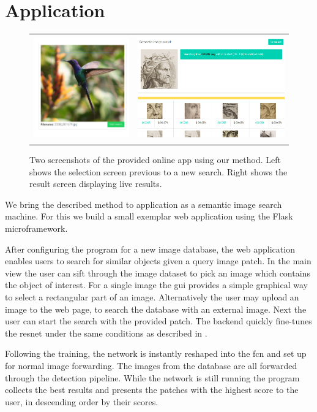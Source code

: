 %
\chapter{Application}
\label{sec:application}
\begin{figure}[h!]
    \begin{tabulary}{\textwidth}{cc}
        \includegraphics[height=4.5cm]{figures/server_select} &
        \includegraphics[height=4.5cm]{figures/server_results}
    \end{tabulary}
    \caption{Two screenshots of the provided online app using our method. Left shows the selection screen previous to a new search. Right shows the result screen displaying live results.}
    \label{fig:application}
\end{figure}
We bring the described method to application as a semantic image search machine. For this we build a small exemplar web application using the Flask microframework.

After configuring the program for a new image database, the web application enables users to search for similar objects given a query image patch. In the main view the user can sift through the image dataset to pick an image which contains the object of interest. For a single image the \gls{gui} provides a simple graphical way to select a rectangular part of an image. Alternatively the user may upload an image to the web page, to search the database with an external image. Next the user can start the search with the provided patch. The backend quickly fine-tunes the \gls{resnet} under the same conditions as described in .

Following the training, the network is instantly reshaped into the \gls{fcn} and set up for normal image forwarding. The images from the database are all forwarded through the detection pipeline. While the network is still running the program collects the best results and presents the patches with the highest score to the user, in descending order by their scores.

